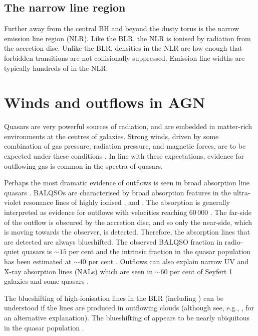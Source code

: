 \subsection{The narrow line region}

Further away from the central BH and beyond the dusty torus is the narrow emission line region (NLR). 
Like the BLR, the NLR is ionised by radiation from the accretion disc. 
Unlike the BLR, densities in the NLR are low enough that forbidden transitions are not collisionally suppressed. 
Emission line widths are typically hundreds of \kms in the NLR. 

\section{Winds and outflows in AGN}

Quasars are very powerful sources of radiation, and are embedded in matter-rich environments at the centres of galaxies.
Strong winds, driven by some combination of gas pressure, radiation pressure, and magnetic forces, are to be expected under these conditions \citep[e.g.][]{blandford82b,proga00,everett05}. 
In line with these expectations, evidence for outflowing gas is common in the spectra of quasars. 

Perhaps the most dramatic evidence of outflows is seen in broad absorption line quasars \citep[BALQSOs;][]{weymann91}.
BALQSOs are characterised by broad absorption features in the ultra-violet resonance lines of highly ionised ,  and . 
The absorption is generally interpreted as evidence for outflows with velocities reaching $60\,000$ \kms \citep[e.g.][]{turnshek88}.
The far-side of the outflow is obscured by the accretion disc, and so only the near-side, which is moving towards the observer, is detected. 
Therefore, the absorption lines that are detected are always blueshifted. 
The observed  BALQSO fraction in radio-quiet quasars is $\sim15$ per cent \citep[e.g.][]{hewett03,reichard03} and the intrinsic fraction in the quasar population has been estimated at $\sim40$ per cent \citep{allen11}.
Outflows can also explain narrow UV and X-ray absorption lines (NALs) which are seen in $\sim60$ per cent of Seyfert 1 galaxies \citep{crenshaw99}  and some quasars \citep[e.g.][]{hamann97}. 

The blueshifting of high-ionisation lines in the BLR (including ) can be understood if the lines are produced in outflowing clouds (although see, e.g., \citealt{gaskell16}, for an alternative explanation). 
The blueshifting of  appears to be nearly ubiquitous in the quasar population \citep[e.g.][]{richards02,richards11}. 


